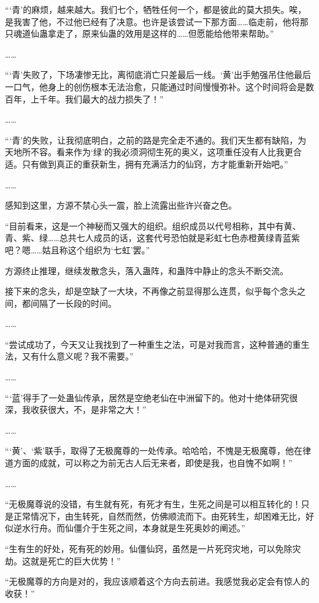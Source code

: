 \begin{this_body}
“‘青’的麻烦，越来越大。我们七个，牺牲任何一个，都是彼此的莫大损失。唉，是我害了他，不过他已经有了决意。也许是该尝试一下那方面……临走前，他将那只魂道仙蛊拿走了，原来仙蛊的效用是这样的……但愿能给他带来帮助。”

……

“‘青’失败了，下场凄惨无比，离彻底消亡只差最后一线。‘黄’出手勉强吊住他最后一口气，他身上的创伤根本无法治愈，只能通过时间慢慢弥补。这个时间将会是数百年，上千年。我们最大的战力损失了！”

……

“‘青’的失败，让我彻底明白，之前的路是完全走不通的。我们天生都有缺陷，为天地所不容。看来作为‘绿’的我必须洞彻生死的奥义，这项重任没有人比我更合适。只有做到真正的重获新生，拥有充满活力的仙窍，方才能重新开始吧。”

……

感知到这里，方源不禁心头一震，脸上流露出些许兴奋之色。

“目前看来，这是一个神秘而又强大的组织。组织成员以代号相称，其中有黄、青、紫、绿……总共七人成员的话，这套代号恐怕就是彩虹七色赤橙黄绿青蓝紫吧？嗯……姑且称这个组织为‘七虹’罢。”

方源终止推理，继续发散念头，落入蛊阵，和蛊阵中静止的念头不断交流。

接下来的念头，却是空缺了一大块，不再像之前显得那么连贯，似乎每个念头之间，都间隔了一长段的时间。

……

“尝试成功了，今天又让我找到了一种重生之法，可是对我而言，这种普通的重生法，又有什么意义呢？我不需要。”

……

“‘蓝’得手了一处蛊仙传承，居然是空绝老仙在中洲留下的。他对十绝体研究很深，我收获很大，不，是非常之大！”

……

“‘黄’、‘紫’联手，取得了无极魔尊的一处传承。哈哈哈，不愧是无极魔尊，他在律道方面的成就，可以称之为前无古人后无来者，即使是我，也自愧不如啊！”

……

“无极魔尊说的没错，有生就有死，有死才有生，生死之间是可以相互转化的！只是正常情况下，由生转死，自然而然，仿佛顺流而下。由死转生，却困难无比，好似逆水行舟。而仙僵介于生死之间，本身就是生死奥妙的阐述。”

“生有生的好处，死有死的妙用。仙僵仙窍，虽然是一片死窍灾地，可以免除灾劫。这就是死亡的巨大优势！”

“无极魔尊的方向是对的，我应该顺着这个方向去前进。我感觉我必定会有惊人的收获！”


\end{this_body}
